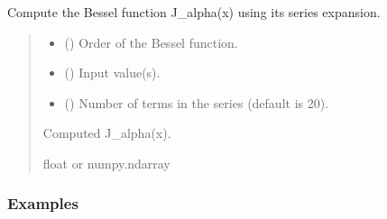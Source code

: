 \documentclass[a4paper,10pt,english]{sphinxmanual}
\begin{document}
\begin{fulllineitems}
\label{\detokenize{index:acsefunctions.special.bessel}}
\pysigstartsignatures
\pysiglinewithargsret
{}
{\sphinxparamcomma {}\sphinxparamcomma {}}
{}
\pysigstopsignatures
\sphinxAtStartPar
Compute the Bessel function J\_alpha(x) using its series expansion.
\begin{quote}\begin{description}
\begin{itemize}
\item {} 
\sphinxAtStartPar
{} () \textendash{} Order of the Bessel function.

\item {} 
\sphinxAtStartPar
{} () \textendash{} Input value(s).

\item {} 
\sphinxAtStartPar
{} (\sphinxstyleliteralemphasis{\sphinxupquote{, }}) \textendash{} Number of terms in the series (default is 20).

\end{itemize}

\sphinxAtStartPar
Computed J\_alpha(x).

\sphinxAtStartPar
float or numpy.ndarray

\end{description}\end{quote}
\subsubsection*{Examples}

\begin{sphinxVerbatim}[commandchars=\\\{\}]
 
   
 \PYG{p}{[} \PYG{p}{]}
\end{sphinxVerbatim}

\end{fulllineitems}
\end{document}
